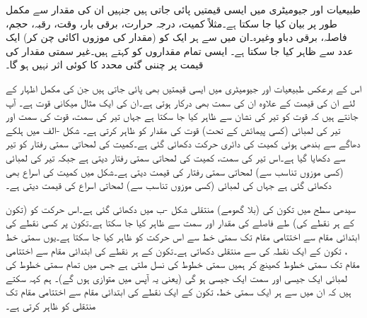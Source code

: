 طبیعیات اور جیومیٹری میں ایسی قیمتیں پائی جاتی ہیں جنہیں ان کی مقدار سے مکمل طور پر بیان کیا جا سکتا ہے۔مثلاً  کمیت، درجہ حرارت، برقی بار، وقت، رقبہ، حجم، فاصلہ، برقی دباو وغیرہ۔ان میں سے ہر ایک کو (مقدار کی موزوں اکائی چن کر) ایک عدد  سے ظاہر کیا جا سکتا ہے۔ ایسی تمام مقداروں کو  کہتے ہیں۔غیر سمتی مقدار کی قیمت پر چننی گئی محدد کا کوئی اثر نہیں ہو گا۔

اس کے برعکس طبیعیات اور جیومیٹری میں ایسی قیمتیں بھی پائی جاتی ہیں جن کی مکمل اظہار کے لئے ان کی قیمت کے علاوہ ان کی سمت بھی درکار ہوتی ہے۔ان کی ایک مثال میکانی  قوت ہے۔ آپ جانتے ہیں کہ قوت کو تیر کی نشان سے ظاہر کیا جا سکتا ہے جہاں تیر کی سمت، قوت کی سمت اور تیر کی لمبائی (کسی پیمائش کے تحت) قوت کی مقدار کو ظاہر کرتی ہے۔ شکل -الف میں ہلکے دھاگے سے بندھی ہوئی کمیت  کی دائری حرکت دکھائی گئی ہے۔کمیت کی لمحاتی سمتی رفتار  کو تیر سے دکھایا گیا ہے۔اس تیر کی سمت، کمیت کی لمحاتی سمتی رفتار دیتی ہے جبکہ تیر کی لمبائی (کسی موزوں تناسب سے) لمحاتی سمتی رفتار کی قیمت دیتی ہے۔شکل میں کمیت کی اسراع  بھی دکھائی گئی ہے جہاں  کی لمبائی (کسی موزوں تناسب سے) لمحاتی اسراع کی قیمت دیتی ہے۔

سیدھی سطح میں تکون کی (بلا گھومے) منتقلی شکل -ب میں  دکھائی گئی ہے۔اس حرکت کو (تکون کے ہر نقطے کی) طے فاصلے  کی مقدار اور سمت سے ظاہر کیا جا سکتا ہے۔تکون پر کسی نقطے کی ابتدائی مقام  سے اختتامی مقام  تک سمتی خط سے اس حرکت کو ظاہر کیا جا سکتا ہے۔یوں سمتی خط ، تکون کے ایک نقطہ کی  سے  منتقلی دکھاتی ہے۔تکون کے ہر نقطے کی ابتدائی مقام سے اختتامی مقام تک سمتی خطوط کھینچ کر ہمیں سمتی خطوط کی نسل ملتی ہے جس میں تمام سمتی  خطوط کی لمبائی ایک جیسی  اور  سمت  ایک جیسی ہو گی (یعنی یہ آپس میں متوازی ہوں گے)۔ ہم کہہ سکتے ہیں کہ ان میں سے ہر ایک سمتی خط، تکون کے ایک نقطے کی ابتدائی مقام سے اختتامی مقام تک منتقلی کو ظاہر کرتی ہے۔ 


